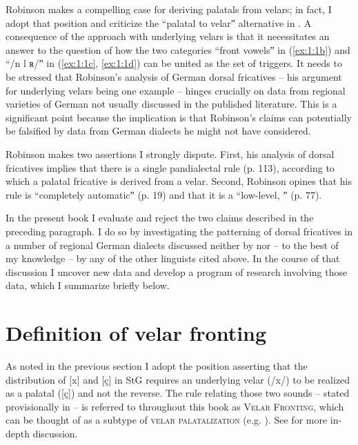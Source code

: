 Robinson makes a compelling case for deriving palatals from velars; in fact, I adopt that position and criticize the “palatal to velarˮ alternative in . A consequence of the approach with underlying velars is that it necessitates an answer to the question of how the two categories “front vowelsˮ in (\ref{ex:1:1b}) and “/n l ʀ/ˮ in (\ref{ex:1:1c}, \ref{ex:1:1d}) can be united as the set of triggers. It needs to be stressed that Robinson’s analysis of German dorsal fricatives -- his argument for underlying velars being one example -- hinges crucially on data from regional varieties of German not usually discussed in the published literature. This is a significant point because the implication is that Robinson’s claims can potentially be falsified by data from German dialects he might not have considered. 

Robinson makes two assertions I strongly dispute. First, his analysis of dorsal fricatives implies that there is a single pandialectal rule (p. 113), according to which a palatal fricative is derived from a velar. Second, Robinson opines that his rule is “completely automaticˮ (p. 19) and that it is a “low-level, ˮ (p. 77).

In the present book I evaluate and reject the two claims described in the preceding paragraph. I do so by investigating the patterning of dorsal fricatives in a number of regional German dialects discussed neither by \citet{Robinson2001} nor -- to the best of my knowledge -- by any of the other linguists cited above. In the course of that discussion I uncover new data and develop a program of research involving those data, which I summarize briefly below.

\section{{Definition} {of} {velar} {fronting}}\label{sec:1.3}

As noted in the previous section I adopt the position asserting that the distribution of [x] and [ç] in StG requires an underlying velar (/x/) to be realized as a palatal ([ç]) and not the reverse. The rule relating those two sounds -- stated provisionally in  -- is referred to throughout this book as \textsc{Velar} \textsc{Fronting}, which can be thought of as a subtype of \textsc{velar} \textsc{palatalization} (e.g. \citealt{Bateman2007}). See  for more in-depth discussion.

